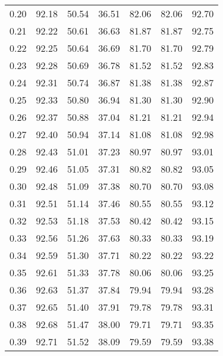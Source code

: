 \begin{tabular}{|c|c|c|c|c|c|c|}
      0.20 &     92.18 &     50.54 &      36.51 &   82.06 &      82.06 &         92.70 \\
      0.21 &     92.22 &     50.61 &      36.63 &   81.87 &      81.87 &         92.75 \\
      0.22 &     92.25 &     50.64 &      36.69 &   81.70 &      81.70 &         92.79 \\
      0.23 &     92.28 &     50.69 &      36.78 &   81.52 &      81.52 &         92.83 \\
      0.24 &     92.31 &     50.74 &      36.87 &   81.38 &      81.38 &         92.87 \\
      0.25 &     92.33 &     50.80 &      36.94 &   81.30 &      81.30 &         92.90 \\
      0.26 &     92.37 &     50.88 &      37.04 &   81.21 &      81.21 &         92.94 \\
      0.27 &     92.40 &     50.94 &      37.14 &   81.08 &      81.08 &         92.98 \\
      0.28 &     92.43 &     51.01 &      37.23 &   80.97 &      80.97 &         93.01 \\
      0.29 &     92.46 &     51.05 &      37.31 &   80.82 &      80.82 &         93.05 \\
      0.30 &     92.48 &     51.09 &      37.38 &   80.70 &      80.70 &         93.08 \\
      0.31 &     92.51 &     51.14 &      37.46 &   80.55 &      80.55 &         93.12 \\
      0.32 &     92.53 &     51.18 &      37.53 &   80.42 &      80.42 &         93.15 \\
      0.33 &     92.56 &     51.26 &      37.63 &   80.33 &      80.33 &         93.19 \\
      0.34 &     92.59 &     51.30 &      37.71 &   80.22 &      80.22 &         93.22 \\
      0.35 &     92.61 &     51.33 &      37.78 &   80.06 &      80.06 &         93.25 \\
      0.36 &     92.63 &     51.37 &      37.84 &   79.94 &      79.94 &         93.28 \\
      0.37 &     92.65 &     51.40 &      37.91 &   79.78 &      79.78 &         93.31 \\
      0.38 &     92.68 &     51.47 &      38.00 &   79.71 &      79.71 &         93.35 \\
      0.39 &     92.71 &     51.52 &      38.09 &   79.59 &      79.59 &         93.38 \\

\end{tabular}
